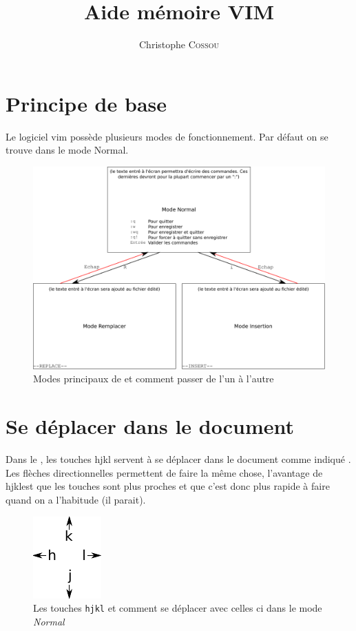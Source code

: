 \documentclass[a4paper,twoside]{article}
\title{Aide mémoire VIM}
\author{Christophe \textsc{Cossou}}
\begin{document}
\tableofcontents

\clearpage
\section{Principe de base}
Le logiciel vim possède plusieurs modes de fonctionnement. Par défaut on se trouve dans le mode Normal.

\begin{figure}[htb]
\centering
\includegraphics[width=0.7\linewidth]{vim_modes.pdf}
\caption{Modes principaux de  et comment passer de l'un à l'autre}
\end{figure}

\section{Se déplacer dans le document}
Dans le , les touches hjkl servent à se déplacer dans le document comme indiqué . Les flèches directionnelles permettent de faire la même chose, l'avantage de \og hjkl\fg est que les touches sont plus proches et que c'est donc plus rapide à faire quand on a l'habitude (il parait).

\begin{figure}[htb]
\centering
\includegraphics[width=0.25\linewidth]{vim_hjkl.pdf}
\caption{Les touches \texttt{hjkl} et comment se déplacer avec celles ci dans le mode \emph{Normal}}\label{fig:hjkl}
\end{figure}
\end{document}

